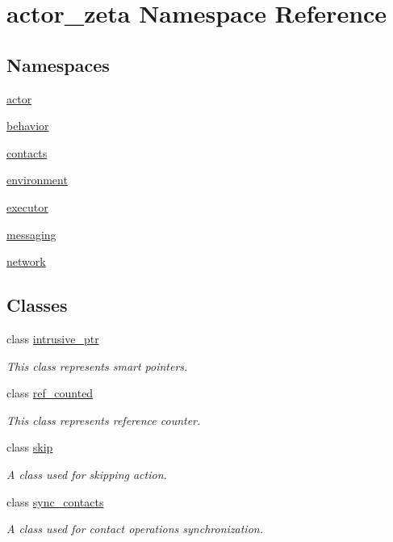 \hypertarget{namespaceactor__zeta}{}\section{actor\+\_\+zeta Namespace Reference}
\label{namespaceactor__zeta}
\subsection*{Namespaces}
\begin{DoxyCompactItemize}
\item 
 \hyperlink{namespaceactor__zeta_1_1actor}{actor}
\item 
 \hyperlink{namespaceactor__zeta_1_1behavior}{behavior}
\item 
 \hyperlink{namespaceactor__zeta_1_1contacts}{contacts}
\item 
 \hyperlink{namespaceactor__zeta_1_1environment}{environment}
\item 
 \hyperlink{namespaceactor__zeta_1_1executor}{executor}
\item 
 \hyperlink{namespaceactor__zeta_1_1messaging}{messaging}
\item 
 \hyperlink{namespaceactor__zeta_1_1network}{network}
\end{DoxyCompactItemize}
\subsection*{Classes}
\begin{DoxyCompactItemize}
\item 
class \hyperlink{classactor__zeta_1_1intrusive__ptr}{intrusive\+\_\+ptr}
\begin{DoxyCompactList}\small\item\em This class represents smart pointers. \end{DoxyCompactList}\item 
class \hyperlink{classactor__zeta_1_1ref__counted}{ref\+\_\+counted}
\begin{DoxyCompactList}\small\item\em This class represents reference counter. \end{DoxyCompactList}\item 
class \hyperlink{classactor__zeta_1_1skip}{skip}
\begin{DoxyCompactList}\small\item\em A class used for skipping action. \end{DoxyCompactList}\item 
class \hyperlink{classactor__zeta_1_1sync__contacts}{sync\+\_\+contacts}
\begin{DoxyCompactList}\small\item\em A class used for contact operations synchronization. \end{DoxyCompactList}\end{DoxyCompactItemize}
